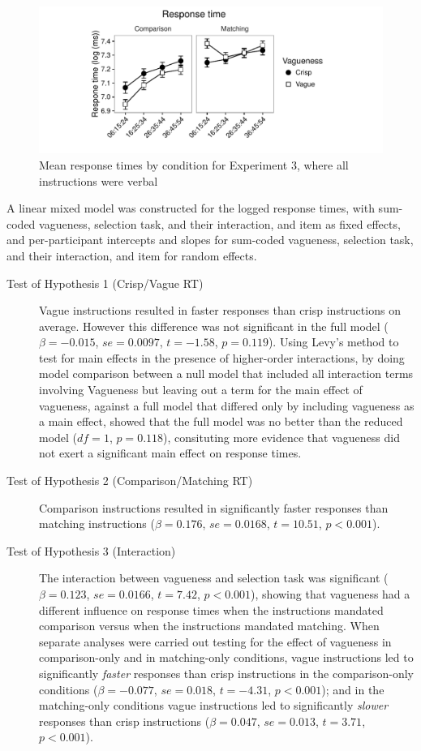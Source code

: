 \documentclass[ %
  graybox       %
 ,envcountchap  %
 ,sectrefs      %
]{svmono}
\begin{document}
\begin{figure}[htbp]
\centering
\includegraphics[width=\textwidth]{figures/Ee3-rtplot-1.pdf}
\caption{Mean response times by condition for Experiment 3, where all instructions were verbal}
\label{resultsE-exp-3}
\end{figure}

A linear mixed model was constructed for the logged response times, with sum-coded vagueness, selection task, and their interaction, and item as fixed effects, and per-participant intercepts and slopes for sum-coded vagueness, selection task, and their interaction, and item for random effects.

\begin{description}
	\item [Test of Hypothesis 1 (Crisp/Vague RT)] Vague instructions resulted in faster responses than crisp instructions on average. However this difference was not significant in the full model ($\beta=-0.015$, $se=0.0097$, $t=-1.58$, $p=0.119$). Using Levy's method \citep{Levy:MainEffectsInteractions} to test for main effects in the presence of higher-order interactions, by doing model comparison between a null model that included all interaction terms involving Vagueness but leaving out a term for the main effect of vagueness, against a full model that differed only by including vagueness as a main effect, showed that the full model was no better than the reduced model ($df=1$, $p=0.118$), consituting more evidence that vagueness did not exert a significant main effect on response times.
	\item [Test of Hypothesis 2 (Comparison/Matching RT)] Comparison instructions resulted in significantly faster responses than matching instructions ($\beta=0.176$, $se=0.0168$, $t=10.51$, $p<0.001$).
	\item [Test of Hypothesis 3 (Interaction)] The interaction between vagueness and selection task was significant ($\beta=0.123$, $se=0.0166$, $t=7.42$, $p<0.001$), showing that vagueness had a different influence on response times when the instructions mandated comparison versus when the instructions mandated matching. When separate analyses were carried out testing for the effect of vagueness in comparison-only and in matching-only conditions, vague instructions led to significantly \emph{faster} responses than crisp instructions in the comparison-only conditions ($\beta=-0.077$, $se=0.018$, $t=-4.31$, $p<0.001$); and in the matching-only conditions vague instructions led to significantly \emph{slower} responses than crisp instructions ($\beta=0.047$, $se=0.013$, $t=3.71$, $p<0.001$).
\end{description}
\end{document}
